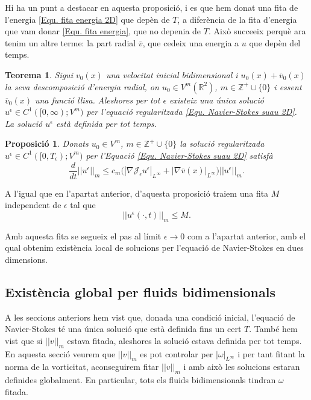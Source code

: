 \documentclass{article}
\numberwithin{equation}{section}
\newtheorem{teorema}{Teorema}[section]
\newtheorem{proposicio}{Proposici\'{o}}[section]
\begin{document}
Hi ha un punt a destacar en aquesta proposici\'{o}, i es que hem donat una fita de l'energia \eqref{Equ. fita energia 2D} que dep\`{e}n de $T$, a difer\`{e}ncia de la fita d'energia que vam donar \eqref{Equ. fita energia}, que no depenia de $T$. Aix\`{o} succeeix perqu\`{e} ara tenim un altre terme: la part radial $\overline v$, que cedeix una energia a $u$ que dep\`{e}n del temps.

\begin{teorema}
Sigui $v_0(x)$ una velocitat inicial bidimensional i $u_0(x)+\overline v_0(x)$ la seva descomposici\'{o} d'energia radial, on $u_0\in V^m(\mathbb{R}^2)$, $m\in\mathbb{Z}^+\cup\{0\}$ i essent $\overline v_0(x)$ una funci\'{o} llisa. Aleshores per tot $\epsilon$ existeix  una \'{u}nica soluci\'{o} $u^{\epsilon}\in C^1([0,\infty);V^m)$ per l'equaci\'{o} regularitzada \eqref{Equ. Navier-Stokes suau 2D}. La soluci\'{o} $u^{\epsilon}$ est\`{a} definida per tot temps.
\end{teorema}

\begin{proposicio}
Donats $u_0\in V^m$, $m\in\mathbb{Z}^+\cup\{0\}$ la soluci\'{o} regularitzada $u^{\epsilon}\in C^1([0,T_{\epsilon});V^m)$ per l'Equaci\'{o} \eqref{Equ. Navier-Stokes suau 2D} satisf\`{a}
\[\frac{d}{dt}||u^{\epsilon}||_m\leq c_m\big(|\nabla\mathcal{J}_{\epsilon}u^{\epsilon}|_{L^{\infty}}+|\nabla\overline v(x)|_{L^{\infty}}\big)||u^{\epsilon}||_m.\]
\end{proposicio}

A l'igual que en l'apartat anterior, d'aquesta proposici\'{o} traiem una fita $M$ independent de $\epsilon$ tal que
\[||u^{\epsilon}(\cdot,t)||_m\leq M.\]

Amb aquesta fita se segueix el pas al l\'{i}mit $\epsilon\to0$ com a l'apartat anterior, amb el qual obtenim exist\`{e}ncia local de solucions per l'equaci\'{o} de Navier-Stokes en dues dimensions.

\subsection{Exist\`{e}ncia global per fluids bidimensionals}\label{Sse: existencia global}

A les seccions anteriors hem vist que, donada una condici\'{o} inicial, l'equaci\'{o} de Navier-Stokes t\'{e} una \'{u}nica soluci\'{o} que est\`{a} definida fins un cert $T$. Tamb\'{e} hem vist que si $||v||_m$ estava fitada, aleshores la soluci\'{o} estava definida per tot temps. En aquesta secci\'{o} veurem que $||v||_m$ es pot controlar per $|\omega|_{L^{\infty}}$ i per tant fitant la norma de la vorticitat, aconseguirem fitar $||v||_m$ i amb aix\`{o} les solucions estaran definides globalment. En particular, tots els fluids bidimensionals tindran $\omega$ fitada.
\end{document}
